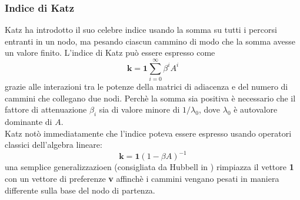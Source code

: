 \subsubsection{Indice di Katz}
Katz ha introdotto il suo celebre indice %
usando la somma su tutti i percorsi entranti in un nodo, ma pesando ciascun cammino di modo che la somma avesse un valore finito. L'indice di Katz può essere espresso come
\begin{equation}
    \textbf{k} = \textbf{1} \sum_{i = 0}^{\infty}{\beta^i A^i}
\end{equation}
grazie alle interazioni tra le potenze della matrici di adiacenza e del numero di cammini che collegano due nodi. Perchè la somma sia positiva è necessario che il fattore di attenuazione $\beta_i$ sia di valore minore di $1 / \lambda_0$, dove $\lambda_0$ è autovalore dominante di $A$.\\
Katz notò immediatamente che l'indice poteva essere espresso usando operatori classici dell'algebra lineare:
\begin{equation}
    \textbf{k} = \textbf{1}(1 - \beta A)^{-1}
\end{equation}
una semplice generalizzazioen (consigliata da Hubbell in %
) rimpiazza il vettore \textbf{1} con un vettore di preferenze \textbf{v} affinchè i cammini vengano pesati in maniera differente sulla base del nodo di partenza.
